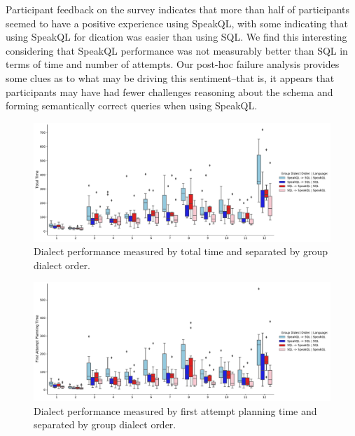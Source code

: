 Participant feedback on the survey indicates that more than half of participants seemed to have a positive experience using SpeakQL, with some indicating that using SpeakQL for dication was easier than using SQL. We find this interesting considering that SpeakQL performance was not measurably better than SQL in terms of time and number of attempts. Our post-hoc failure analysis provides some clues as to what may be driving this sentiment--that is, it appears that participants may have had fewer challenges reasoning about the schema and forming semantically correct queries when using SpeakQL.




\begin{figure}
  \centering
  \includegraphics[width=\linewidth]{figures/query-planning-total-time-withgroups-boxplot.pdf}
  \caption{Dialect performance measured by total time and separated by group dialect order.}
  \label{fig:performancebygrouptotaltime}
\end{figure}

\begin{figure}
  \centering
  \includegraphics[width=\linewidth]{figures/query-planning-first-attempt-time-withgroups-boxplot.pdf}
  \caption{Dialect performance measured by first attempt planning time and separated by group dialect order.}
  \label{fig:performancebygroupfirstattempttime}
\end{figure}

\thematiccoding

